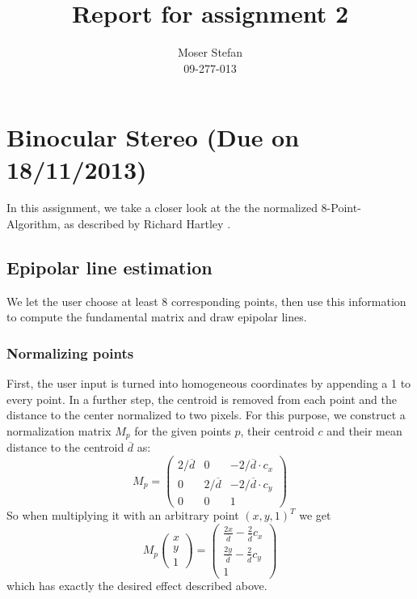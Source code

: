 \documentclass{paper}
\title{Report for assignment 2}
\author{Moser Stefan\\09-277-013}
\begin{document}
\maketitle

\section{Binocular Stereo (Due on 18/11/2013)}

In this assignment, we take a closer look at the
 the normalized 8-Point-Algorithm, as described by Richard Hartley \cite{601246}.

\subsection{Epipolar line estimation}

We let the user choose at least 8 corresponding points, then use this information to compute the fundamental matrix and draw epipolar lines.

\subsubsection{Normalizing points}

First, the user input is turned into homogeneous coordinates by appending a 1 to every point. 
In a further step, the centroid is removed from each point and the distance to the center normalized to two pixels. For this purpose, we construct a normalization matrix $M_p$ for the given points $p$, their centroid $c$ and their mean distance to the centroid $\overline{d}$ as:
\begin{equation}
M_p =
\begin{pmatrix}
	2/\overline{d} & 0 & -2/\overline{d} \cdot c_x \\
	0 & 2/\overline{d} & -2/\overline{d} \cdot c_y \\
	0 & 0 & 1
\end{pmatrix}
\end{equation}
So when multiplying it with an arbitrary point $(x,y,1)^T$ we get
\begin{equation}
M_p \begin{pmatrix}
 x \\
 y \\
 1
\end{pmatrix}
 = \begin{pmatrix}
 	\frac{2x}{\overline{d}} - \frac{2}{\overline{d}}c_x \\
 	\frac{2y}{\overline{d}} - \frac{2}{\overline{d}}c_y \\
 	1
 \end{pmatrix}
\end{equation}
which has exactly the desired effect described above.
\end{document}

